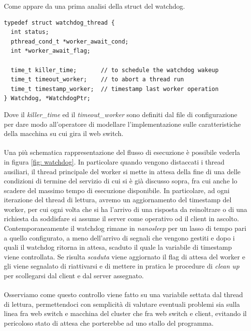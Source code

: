 \documentclass[italian]{tktltiki2}
\begin{document}
Come appare da una prima analisi della struct del watchdog.
\begin{lstlisting}
typedef struct watchdog_thread {
  int status;                                     
  pthread_cond_t *worker_await_cond;             
  int *worker_await_flag;

  time_t killer_time;       // to schedule the watchdog wakeup
  time_t timeout_worker;    // to abort a thread run
  time_t timestamp_worker;  // timestamp last worker operation
} Watchdog, *WatchdogPtr;
\end{lstlisting}
Dove il \emph{killer\_time} ed il \emph{timeout\_worker} sono definiti dal file di configurazione per dare modo all'operatore di modellare l'implementazione sulle caratteristiche della macchina su cui gira il web switch. \\\\
Una più schematica rappresentazione del flusso di esecuzione è possibile vederla in figura \ref{fig: watchdog}.
In particolare quando vengono distaccati i thread ausiliari, il thread principale del worker si mette in attesa della fine di una delle condizioni di termine del servizio di cui si è già discusso sopra, fra cui anche lo scadere del massimo tempo di esecuzione disponibile. In particolare, ad ogni iterazione del thread di lettura, avremo un aggiornamento del timestamp del worker, per cui ogni volta che si ha l'arrivo di una risposta da reinoltrare o di una richiesta da soddisfare si assume il server come operativo od il client in ascolto. \\ 
Contemporaneamente il watchdog rimane in \emph{nanosleep} per un lasso di tempo pari a quello configurato, a meno dell'arrivo di segnali che vengono gestiti e dopo i quali il watchdog ritorna in attesa, scaduto il quale la variabile di timestamp viene controllata. Se risulta \emph{scaduta} viene aggiornato il flag di attesa del worker e gli viene segnalato di riattivarsi e di mettere in pratica le procedure di \emph{clean up} per scollegarsi dal client e dal server assegnato. \\\\
Osserviamo come questo controllo viene fatto su una variabile settata dal thread di lettura, permettendoci con semplicità di valutare eventuali problemi sia sulla linea fra web switch e macchina del cluster che fra web switch e client, evitando il pericoloso stato di attesa che porterebbe ad uno stallo del programma.

\newpage
\end{document}
